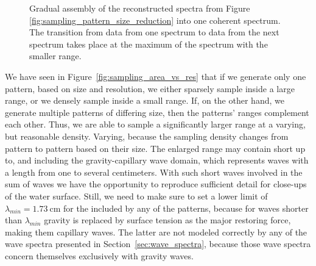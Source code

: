 \begin{figure}[p]
\caption[Gradual assembly of the reconstructed spectra from Figure
\ref{fig:sampling_pattern_size_reduction} into one coherent spectrum.]{
Gradual assembly of the reconstructed spectra from Figure
\ref{fig:sampling_pattern_size_reduction} into one coherent spectrum.
The transition from data from one spectrum to data from the next
spectrum takes place at the maximum \wavenumber of the spectrum with the
smaller \wavenumber range.
}
\label{fig:sampling_pattern_assembly}
\end{figure}
%
We have seen in Figure~\ref{fig:sampling_area_vs_res} that if we generate only
one pattern, based on size and resolution, we either sparsely sample inside a
large \wavenumber range, or we densely sample inside a small \wavenumber range.
If, on the other hand, we generate multiple patterns of differing size, then
the patterns' \wavenumbers ranges complement each other. Thus, we are able
to sample a significantly larger \wavenumber range at a varying, but reasonable
density. Varying, because the sampling density changes from pattern to pattern
based on their size.
The enlarged \wavenumber range may contain short \wavelengths up to, and
including the gravity-capillary wave domain, which represents waves with a
length from one to several centimeters. With such short waves involved in the
sum of waves we have the opportunity to reproduce sufficient detail for
close-ups of the water surface. Still, we need to make sure to set a lower
limit of $\lambda_{min} = \SI{1.73}{\centi\metre}$ for the \wavelengths included
by any of the patterns, because for waves shorter than $\lambda_{min}$ gravity is
replaced by surface tension as the major restoring force, making them
capillary waves. The latter are not modeled correctly by any of the wave
spectra presented in Section~\ref{sec:wave_spectra}, because those wave spectra
concern themselves exclusively with gravity waves.

